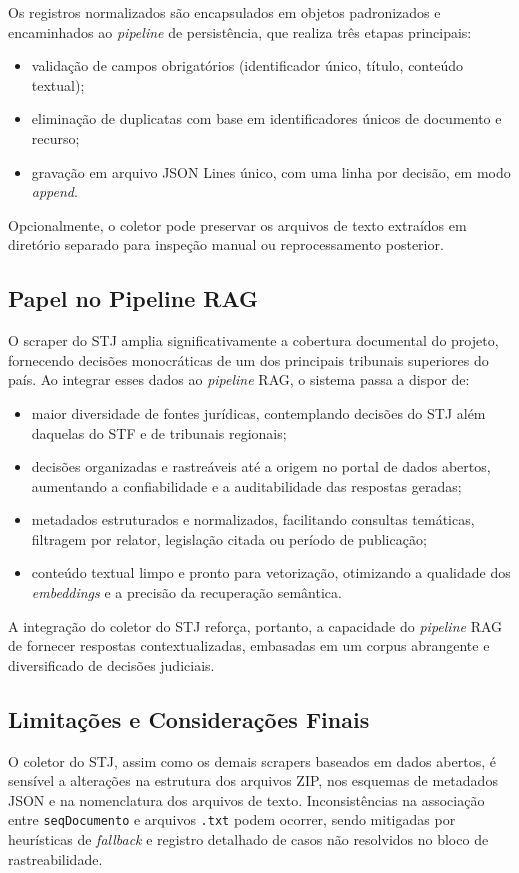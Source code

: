 Os registros normalizados são encapsulados em objetos padronizados e encaminhados ao \textit{pipeline} de persistência, que realiza três etapas principais:
\begin{itemize}
  \item validação de campos obrigatórios (identificador único, título, conteúdo textual);
  \item eliminação de duplicatas com base em identificadores únicos de documento e recurso;
  \item gravação em arquivo JSON Lines único, com uma linha por decisão, em modo \textit{append}.
\end{itemize}

Opcionalmente, o coletor pode preservar os arquivos de texto extraídos em diretório separado para inspeção manual ou reprocessamento posterior.

\subsection{Papel no Pipeline RAG}
O scraper do STJ amplia significativamente a cobertura documental do projeto, fornecendo decisões monocráticas de um dos principais tribunais superiores do país. Ao integrar esses dados ao \textit{pipeline} RAG, o sistema passa a dispor de:

\begin{itemize}
  \item maior diversidade de fontes jurídicas, contemplando decisões do STJ além daquelas do STF e de tribunais regionais;
  \item decisões organizadas e rastreáveis até a origem no portal de dados abertos, aumentando a confiabilidade e a auditabilidade das respostas geradas;
  \item metadados estruturados e normalizados, facilitando consultas temáticas, filtragem por relator, legislação citada ou período de publicação;
  \item conteúdo textual limpo e pronto para vetorização, otimizando a qualidade dos \textit{embeddings} e a precisão da recuperação semântica.
\end{itemize}

A integração do coletor do STJ reforça, portanto, a capacidade do \textit{pipeline} RAG de fornecer respostas contextualizadas, embasadas em um corpus abrangente e diversificado de decisões judiciais.

\subsection{Limitações e Considerações Finais}
O coletor do STJ, assim como os demais scrapers baseados em dados abertos, é sensível a alterações na estrutura dos arquivos ZIP, nos esquemas de metadados JSON e na nomenclatura dos arquivos de texto. Inconsistências na associação entre \texttt{seqDocumento} e arquivos \texttt{.txt} podem ocorrer, sendo mitigadas por heurísticas de \textit{fallback} e registro detalhado de casos não resolvidos no bloco de rastreabilidade.

